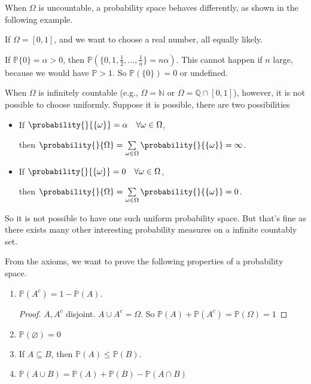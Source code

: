 \begin{remark}
When \(\Omega\) is uncountable, a probability space behaves differently, as shown in the following example.
\begin{example}
    If \(\Omega = [0,1]\), and we want to choose a real number, all equally likely.

    If \(\mathbb{P}\{0\} = \alpha > 0\), then \(\mathbb{P}(\{0,1,\frac{1}{2},\ldots ,\frac{1}{n}\} = n\alpha)\). This cannot happen if \(n\) large, because we would have \(\mathbb{P} > 1\). So \(\mathbb{P}(\{0\}) = 0\) or undefined. 
\end{example}
\end{remark}
\begin{example}
    When \(\Omega\) is infinitely countable (e.g., \(\Omega = \mathbb{N}\) or \(\Omega = \mathbb{Q}\cap [0,1]\)), however, it is not possible to choose uniformly. Suppose it is possible, there are two possibilities
    \begin{itemize}
        \item If \(\probability{}{\{\omega\}} = \alpha \quad \forall \omega \in \Omega\),

        then \(\probability{}{\Omega} = \sum\limits_{\omega \in \Omega} \probability{}{\{\omega\}} = \infty\). \contra
        \item If \(\probability{}{\{\omega\}} = 0 \quad \forall \omega \in \Omega\),

        then \(\probability{}{\Omega} = \sum\limits_{\omega \in \Omega} \probability{}{\{\omega\}} = 0\). \contra
    \end{itemize}
    So it is not possible to have one such uniform probability space. But that's fine as there exists many other interesting probability measures on a infinite countably set.
\end{example}
\begin{property}
From the axioms, we want to prove the following properties of a probability space.
    \begin{enumerate}
\item \(\mathbb{P}(A^c) = 1 - \mathbb{P}(A)\).
\begin{proof}
    \(A, A^c\) disjoint. \(A \cup A^c = \Omega\). So \(\mathbb{P}(A) + \mathbb{P}(A^c) = \mathbb{P}(\Omega) = 1\) 
\end{proof}
\item \(\mathbb{P}(\varnothing) = 0\)
\item If \(A \subseteq B\), then \(\mathbb{P}(A) \leq \mathbb{P}(B)\).
\item \(\mathbb{P}(A\cup B) = \mathbb{P}(A) + \mathbb{P}(B) - \mathbb{P}(A\cap B)\) 
\end{enumerate}
\end{property}

